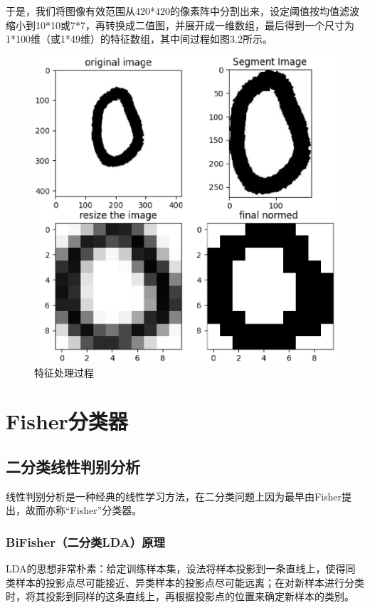 \documentclass[UTF8, a4paper, 12pt]{report}
\begin{document}
			于是，我们将图像有效范围从420*420的像素阵中分割出来，设定阈值按均值滤波缩小到10*10或7*7，再转换成二值图，并展开成一维数组，最后得到一个尺寸为1*100维（或1*49维）的特征数组，其中间过程如图3.2所示。
			\begin{figure}[!h]
			\centering
			\includegraphics[scale=0.35]{./img/FeatureMapping.eps}
			\caption{特征处理过程}
			\label{fig:3.2}
			\end{figure}
\clearpage

\chapter{Fisher分类器}
	\section{二分类线性判别分析}
			线性判别分析是一种经典的线性学习方法，在二分类问题上因为最早由Fisher提出，故而亦称“Fisher”分类器。
		\subsection{BiFisher（二分类LDA）原理}
			LDA的思想非常朴素：给定训练样本集，设法将样本投影到一条直线上，使得同类样本的投影点尽可能接近、异类样本的投影点尽可能远离；在对新样本进行分类时，将其投影到同样的这条直线上，再根据投影点的位置来确定新样本的类别。
\end{document}
